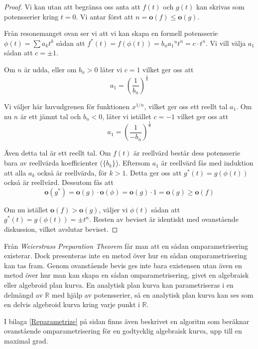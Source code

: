 \begin{proof}
Vi kan utan att begränsa oss anta att $f(t)$ och $g(t)$ kan skrivas som potensserier kring $t = 0$. Vi antar först att $n = \mathbf{o}(f) \leq \mathbf{o}(g)$.

Från resonemanget ovan ser vi att vi kan skapa en formell potensserie $\phi(t) = \sum a_k t^k$ sådan att $f^*(t) = f\left(\phi(t)\right) = b_n {a_1}^n t^n = c \cdot t^n$. Vi vill välja $a_1$ sådan att $c = \pm 1$.

Om $n$ är udda, eller om $b_n > 0$ låter vi $c = 1$ vilket ger oss att
\[a_1 = \left( \frac{1}{b_n} \right) ^ \frac{1}{n}\]

Vi väljer här huvudgrenen för funktionen $x^{1/n}$, vilket ger oss ett reellt tal $a_1$. Om nu $n$ är ett jämnt tal och $b_n < 0$, låter vi istället $c = -1$ vilket ger oss att
\[a_1 = \left( \frac{1}{-b_n} \right) ^ \frac{1}{n}\]

Även detta tal är ett reellt tal. Om $f(t)$ är reellvärd består dess potensserie bara av reellvärda koefficienter ($\{b_k\}$). Eftersom $a_1$ är reellvärd fås med induktion att alla $a_k$ också är reellvärda, för $k > 1$. Detta ger oss att $g^*(t) = g\left(\phi(t)\right)$ också är reellvärd. Dessutom fås att
\[\mathbf{o}(g^*) = \mathbf{o}(g) \cdot \mathbf{o}(\phi) = \mathbf{o}(g) \cdot 1 = \mathbf{o}(g) \geq \mathbf{o}(f)\]

Om nu istället $\mathbf{o}(f) > \mathbf{o}(g)$, väljer vi $\phi(t)$ sådan att $g^*(t) = g\left(\phi(t)\right) = \pm t^n$. Resten av beviset är identiskt med ovanstående diskussion, vilket avslutar beviset.
\end{proof}

Från \emph{Weierstrass Preparation Theorem} \cite{WeierstrassPreparationTheorem} får man att en sådan omparametrisering existerar. Dock presenteras inte en metod över hur en sådan omparametrisering kan tas fram. Genom ovanstående bevis ges inte bara existensen utan även en metod över hur man kan skapa en sådan omparametrisering, givet en algebraisk eller algebroid plan kurva. En analytisk plan kurva kan parametriseras i en delmängd av $\mathbb{R}$ med hjälp av potensserier, så en analytisk plan kurva kan ses som en delvis algebroid kurva kring varje punkt i $\mathbb{R}$.

I bilaga \ref{Reparametrize} på sidan \pageref{Reparametrize} finns även beskrivet en algoritm som beräknar ovanstående omparametrisering för en godtycklig algebraisk kurva, upp till en maximal grad.